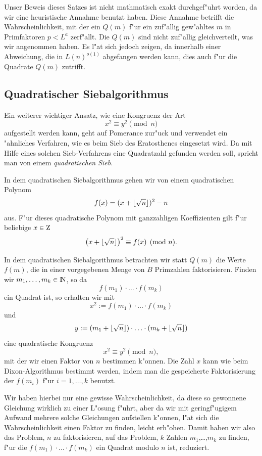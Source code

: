 Unser Beweis dieses Satzes ist nicht mathmatisch exakt durchgef"uhrt
worden, da wir eine heuristische Annahme benutzt haben. Diese Annahme
betrifft die Wahrscheinlichkeit, mit der ein $Q(m)$ f"ur ein zuf"allig
gew"ahltes $m$ in Primfaktoren $p < L^a$ zerf"allt. Die $Q(m)$ sind nicht 
zuf"allig gleichverteilt, was wir angenommen haben.
Es l"a\3t sich jedoch zeigen, da\3 innerhalb einer Abweichung, 
die in $L(n)^{o(1)}$ abgefangen werden kann, dies auch f"ur die 
Quadrate $Q(m)$ zutrifft.


\subsection{Quadratischer Siebalgorithmus}

Ein weiterer wichtiger Ansatz, wie eine Kongruenz der Art
$$ x^2 \equiv y^2 \pmod{n} $$ 
aufgestellt werden kann, geht auf Pomerance zur"uck und verwendet ein
"ahnliches Verfahren, wie es beim Sieb des Eratosthenes eingesetzt
wird. Da mit Hilfe eines solchen Sieb-Verfahrens eine Quadratzahl
gefunden werden soll, spricht man von einem {\em quadratischen Sieb}.

In dem quadratischen Siebalgorithmus gehen wir von einem quadratischen
Polynom
\begin{equation} 
   f(x) = (x + \lfloor \sqrt{n} \rfloor)^2 - n \label{quadpolynom} 
\end{equation}
aus. F"ur dieses quadratische Polynom mit ganzzahligen Koeffizienten
gilt f"ur beliebige $x\in\Z$
$$ \left(x+\lfloor \sqrt{n} \rfloor\right)^2 \equiv f(x) \pmod{n}. $$

In dem quadratischen Siebalgorithmus betrachten wir statt $Q(m)$ die
Werte $f(m)$, die in einer vorgegebenen Menge von $B$ Primzahlen
faktorisieren. Finden wir $m_1,\ldots,m_k \in\N$, so da\3
$$ f(m_1)\cdot \ldots \cdot f(m_k) $$
ein Quadrat ist, so erhalten wir mit
$$ x^2 := f(m_1)\cdot\ldots\cdot f(m_k) $$
und 
$$ y:=(m_1 + \lfloor \sqrt{n} \rfloor) \cdot\ldots\cdot (m_k + \lfloor \sqrt{n} \rfloor) $$
eine quadratische Kongruenz
$$ x^2 \equiv y^2 \pmod{n}, $$
mit der wir einen Faktor von $n$ bestimmen k"onnen. Die Zahl $x$ kann
wie beim Dixon-Algorithmus bestimmt werden, indem man die
gespeicherte Faktorisierung der $f(m_i)$ f"ur $i=1,\ldots,k$
benutzt.

Wir haben hierbei nur eine gewisse Wahrscheinlichkeit, da\3 diese so
gewonnene Gleichung wirklich zu einer L"osung f"uhrt, aber da wir mit
geringf"ugigem Aufwand mehrere solche Gleichungen aufstellen k"onnen,
l"a\3t sich die Wahrscheinlichkeit einen Faktor zu finden, leicht
erh"ohen. Damit haben wir also das Problem, $n$ zu faktorisieren, auf
das Problem, $k$ Zahlen $m_1$,\ldots,$m_k$ zu finden, f"ur die
$f(m_1)\cdot\ldots\cdot f(m_k)$ ein Quadrat modulo $n$ ist, reduziert.

